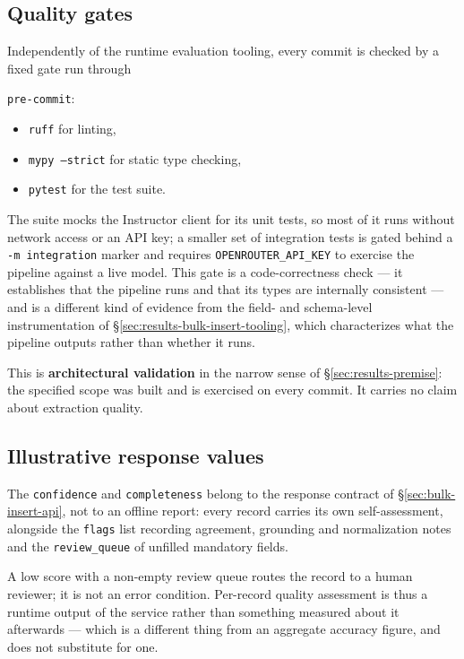 \subsection{Quality gates}
\label{sec:results-bulk-insert-quality-gates}

Independently of the runtime evaluation tooling, every commit is checked by a fixed gate run through 

\texttt{pre-commit}:
\begin{itemize}
\item \texttt{ruff} for linting, 
\item \texttt{mypy --strict} for static type checking, 
\item \texttt{pytest} for the test suite. 
\end{itemize}

The suite mocks the Instructor client for its unit tests, so most of it runs without network access or an API key; a smaller set of integration tests is gated behind a \texttt{-m integration} marker and requires \texttt{OPENROUTER\_API\_KEY} to exercise the pipeline against a live model. This gate is a code-correctness check — it establishes that the pipeline runs and that its types are internally consistent — and is a different kind of evidence from the field- and schema-level instrumentation of \S\ref{sec:results-bulk-insert-tooling}, which characterizes what the pipeline outputs rather than whether it runs.

This is \textbf{architectural validation} in the narrow sense of \S\ref{sec:results-premise}: the specified scope was built and is exercised on every commit. It carries no claim about extraction quality.

\subsection{Illustrative response values}
\label{sec:results-bulk-insert-illustrative}

The \texttt{confidence} and \texttt{completeness} belong to the response contract of \S\ref{sec:bulk-insert-api}, not to an offline report: every record carries its own self-assessment, alongside the \texttt{flags} list recording agreement, grounding and normalization notes and the \texttt{review\_queue} of unfilled mandatory fields. 

A low score with a non-empty review queue routes the record to a human reviewer; it is not an error condition. Per-record quality assessment is thus a runtime output of the service rather than something measured about it afterwards — which is a different thing from an aggregate accuracy figure, and does not substitute for one.

